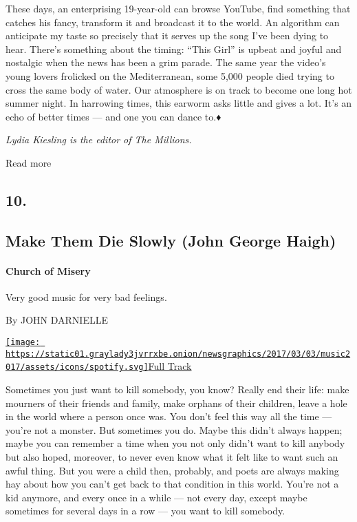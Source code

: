 These days, an enterprising 19-year-old can browse YouTube, find
something that catches his fancy, transform it and broadcast it to the
world. An algorithm can anticipate my taste so precisely that it serves
up the song I've been dying to hear. There's something about the timing:
``This Girl'' is upbeat and joyful and nostalgic when the news has been
a grim parade. The same year the video's young lovers frolicked on the
Mediterranean, some 5,000 people died trying to cross the same body of
water. Our atmosphere is on track to become one long hot summer night.
In harrowing times, this earworm asks little and gives a lot. It's an
echo of better times --- and one you can dance to.♦

\emph{Lydia Kiesling is the editor of The Millions.}

Read more

\hypertarget{10}{%
\subsection{10.}\label{10}}

\hypertarget{--make-them-die-slowly-john-george-haigh}{%
\subsection{\texorpdfstring{ Make Them Die Slowly (John George
Haigh)}{  Make Them Die Slowly (John George Haigh)}}\label{--make-them-die-slowly-john-george-haigh}}

\hypertarget{church-of-misery}{%
\paragraph{Church of Misery}\label{church-of-misery}}

Very good music for very bad feelings.

By JOHN DARNIELLE

\href{https://open.spotify.com/track/08O2pHuPdcJ5PoxFqbpxLO}{\texttt{[image: https://static01.graylady3jvrrxbe.onion/newsgraphics/2017/03/03/music2017/assets/icons/spotify.svg]}Full
Track}

Sometimes you just want to kill somebody, you know? Really end their
life: make mourners of their friends and family, make orphans of their
children, leave a hole in the world where a person once was. You don't
feel this way all the time --- you're not a monster. But sometimes you
do. Maybe this didn't always happen; maybe you can remember a time when
you not only didn't want to kill anybody but also hoped, moreover, to
never even know what it felt like to want such an awful thing. But you
were a child then, probably, and poets are always making hay about how
you can't get back to that condition in this world. You're not a kid
anymore, and every once in a while --- not every day, except maybe
sometimes for several days in a row --- you want to kill somebody.

